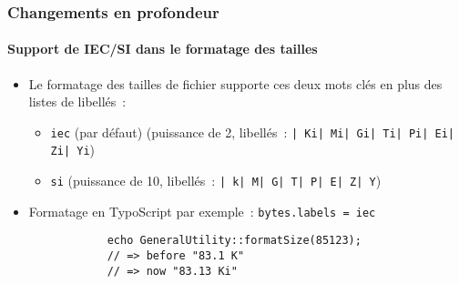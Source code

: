 \begin{frame}[fragile]
	\frametitle{Changements en profondeur}
	\framesubtitle{Support de IEC/SI dans le formatage des tailles}


	\begin{itemize}

		\item Le formatage des tailles de fichier supporte ces deux mots clés en plus des listes de libellés~:

			\begin{itemize}
				\item \small\texttt{iec} (par défaut)\newline
					\small(puissance de 2, libellés~: \texttt{| Ki| Mi| Gi| Ti| Pi| Ei| Zi| Yi})\normalsize
				\item \small\texttt{si}\newline
					\small(puissance de 10, libellés~: \texttt{| k| M| G| T| P| E| Z| Y})\normalsize
			\end{itemize}

		\item Formatage en TypoScript par exemple~:\newline
			\texttt{bytes.labels = iec}

		\begin{lstlisting}
			echo GeneralUtility::formatSize(85123);
			// => before "83.1 K"
			// => now "83.13 Ki"
		\end{lstlisting}

	\end{itemize}

\end{frame}


